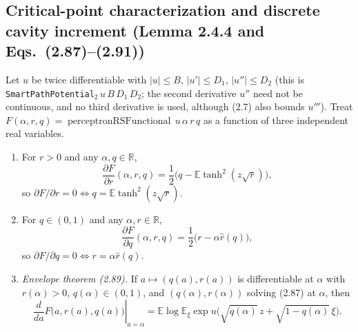 \subsection{Critical-point characterization and discrete cavity increment (Lemma 2.4.4 and Eqs.~(2.87)--(2.91))}
\label{sub:sg-tal:perceptron-rs-variational}

\begin{lemma}\label{lem:sg-tal:perceptron-rs-variational}
  \leanok
Let $u$ be twice differentiable with $|u|\le B$, $|u'|\le D_1$, $|u''|\le D_2$ (this is
\texttt{SmartPathPotential}$_2\,u\,B\,D_1\,D_2$; the second derivative $u''$ need not be continuous, and no
third derivative is used, although (2.7) also bounds $u'''$). Treat
$F(\alpha,r,q)=\operatorname{perceptronRSFunctional}\,u\,\alpha\,r\,q$ as a function of three
independent real variables.
\begin{enumerate}
\item For $r>0$ and any $\alpha,q\in\mathbb R$,
\[
 \frac{\partial F}{\partial r}(\alpha,r,q)
 =\frac{1}{2}\bigl(q-\mathbb E\tanh^2(z\sqrt r)\bigr),
\]
so $\partial F/\partial r=0\iff q=\mathbb E\tanh^2(z\sqrt r)$.
\item For $q\in(0,1)$ and any $\alpha,r\in\mathbb R$,
\[
 \frac{\partial F}{\partial q}(\alpha,r,q)
 =\frac{1}{2}\bigl(r-\alpha\widehat r(q)\bigr),
\]
so $\partial F/\partial q=0\iff r=\alpha\widehat r(q)$.
\item \emph{Envelope theorem (2.89).} If $a\mapsto(q(a),r(a))$ is differentiable at $\alpha$ with
$r(\alpha)>0$, $q(\alpha)\in(0,1)$, and $(q(\alpha),r(\alpha))$ solving (2.87) at $\alpha$, then
\[
 \left.\frac{d}{da}F\bigl(a,r(a),q(a)\bigr)\right|_{a=\alpha}
 =\mathbb E\log\mathbb E_\xi\exp u\bigl(\sqrt{q(\alpha)}\,z+\sqrt{1-q(\alpha)}\,\xi\bigr).
\]
\end{enumerate}
\end{lemma}
